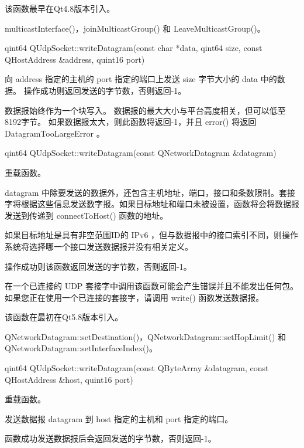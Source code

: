 该函数最早在Qt4.8版本引入。

\begin{seeAlso}
multicastInterface()，joinMulticastGroup() 和 LeaveMulticastGroup()。
\end{seeAlso}

qint64 QUdpSocket::writeDatagram(const char *data, qint64 size, const QHostAddress \&address, quint16 port)

向 address 指定的主机的 port 指定的端口上发送 size 字节大小的 data 中的数据。
操作成功则返回发送的字节数，否则返回-1。

数据报始终作为一个块写入。 数据报的最大大小与平台高度相关，但可以低至8192字节。 
如果数据报太大，则此函数将返回-1，并且 error() 将返回 DatagramTooLargeError 。

qint64 QUdpSocket::writeDatagram(const QNetworkDatagram \&datagram)

重载函数。

datagram 中除要发送的数据外，还包含主机地址，端口，接口和条数限制。套接字将根据这些信息发送数字报。如果目标地址和端口未被设置，函数将会将数据报发送到传递到 connectToHost() 函数的地址。

如果目标地址是具有非空范围ID的 IPv6 ，但与数据报中的接口索引不同，则操作系统将选择哪一个接口发送数据报并没有相关定义。

操作成功则该函数返回发送的字节数，否则返回-1。

\begin{warning}
​在一个已连接的 UDP 套接字中调用该函数可能会产生错误并且不能发出任何包。
如果您正在使用一个已连接的套接字，请调用 write() 函数发送数据报。
\end{warning}

该函数在最初在Qt5.8版本引入。

\begin{seeAlso}
QNetworkDatagram::setDestination()，QNetworkDatagram::setHopLimit() 和 QNetworkDatagram::setInterfaceIndex()。
\end{seeAlso}

qint64 QUdpSocket::writeDatagram(const QByteArray \&datagram, const QHostAddress \&host, quint16 port)

重载函数。

发送数据报 datagram 到 host 指定的主机和 port 指定的端口。

函数成功发送数据报后会返回发送的字节数，否则返回-1。